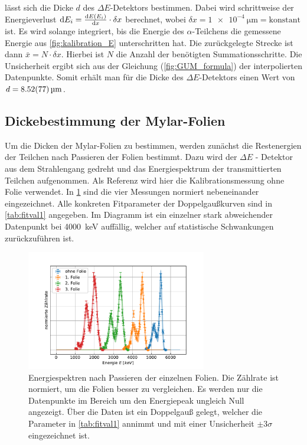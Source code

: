 lässt sich die Dicke $d$ des $\Delta E$-Detektors bestimmen.
Dabei wird schrittweise der Energieverlust $\dd E_i = \dv{E\left(E_i\right)}{x} \cdot \delta x$ berechnet, wobei $\delta x = \SI{1e-4}{\micro\meter} = \text{konstant}$ ist.
Es wird solange integriert, bis die Energie des $\alpha$-Teilchens die gemessene Energie aus \cref{fig:kalibration_E} unterschritten hat.
Die zurückgelegte Strecke ist dann $\bar{x} = N \cdot \delta x$. %
Hierbei ist $N$ die Anzahl der benötigten Summationsschritte.
Die Unsicherheit ergibt sich aus der Gleichung (\ref{fig:GUM_formula}) der interpolierten Datenpunkte. %
Somit erhält man für die Dicke des $\Delta E$-Detektors einen Wert von $d=\SI{8.52 +- 0.77}{\micro\meter}$. 

\subsection{Dickebestimmung der Mylar-Folien}
\label{sec:dicke}

Um die Dicken der Mylar-Folien zu bestimmen, werden zunächst die Restenergien der Teilchen nach Passieren der Folien bestimmt.
Dazu wird der $\Delta E$ - Detektor aus dem Strahlengang gedreht und das Energiespektrum der transmittierten Teilchen aufgenommen.
Als Referenz wird hier die Kalibrationsmessung ohne Folie verwendet.
In \cref{fig:foliendicke} sind die vier Messungen normiert nebeneinander eingezeichnet.
Alle konkreten Fitparameter der Doppelgaußkurven sind in \cref{tab:fitval1} angegeben.
Im Diagramm ist ein einzelner stark abweichender Datenpunkt bei \SI{4000}{\kilo\electronvolt} auffällig, welcher auf statistische Schwankungen zurückzuführen ist.

\begin{figure}[ht]
	\centering
	\includegraphics[width=0.7\textwidth]{dat/m3_foliendicke.pdf}
	\caption{Energiespektren nach Passieren der einzelnen Folien.
			Die Zählrate ist normiert, um die Folien besser zu vergleichen.
			Es werden nur die Datenpunkte im Bereich um den Energiepeak ungleich Null angezeigt.
			Über die Daten ist ein Doppelgauß gelegt, welcher die Parameter in \cref{tab:fitval1} annimmt und mit einer Unsicherheit $\pm 3 \sigma$ eingezeichnet ist.}
	\label{fig:foliendicke}
\end{figure}


